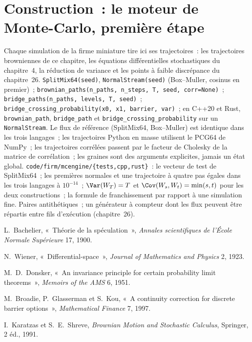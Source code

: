 \section{Construction~: le moteur de Monte-Carlo, première étape}\label{bld:qm:brownian-motion:mcengine}

\begin{build}
 Chaque simulation de la firme miniature tire ici ses trajectoires~: les trajectoires browniennes de ce chapitre,
les équations différentielles stochastiques du chapitre~4, la réduction de variance
et les points à faible discrépance du chapitre~26.
 \texttt{SplitMix64(seed)}, \texttt{NormalStream(seed)} (Box--Muller, cosinus
en premier)~; \texttt{brownian\_paths(n\_paths, n\_steps, T, seed, corr=None)}~;
\texttt{bridge\_paths(n\_paths, levels, T, seed)}~;
\texttt{bridge\_crossing\_probability(x0, x1, barrier, var)}~; en C++20 et Rust,
\texttt{brownian\_path}, \texttt{bridge\_path} et \texttt{bridge\_crossing\_probability} sur un
\texttt{NormalStream}.
 Le flux de référence (SplitMix64, Box--Muller) est identique dans les trois
langages~; les trajectoires Python en masse utilisent le PCG64 de NumPy~; les trajectoires corrélées passent par le facteur de Cholesky
de la matrice de corrélation~; les graines sont des arguments explicites, jamais un état global.
 \texttt{code/firm/mcengine/\{tests,cpp,rust\}}~: le vecteur de test
de SplitMix64~; les premières normales et une trajectoire à quatre pas égales dans les trois langages à $10^{-14}$~;
$\Var(W_T) = T$ et $\Cov(W_s, W_t) = \min(s,t)$ pour les deux constructions~; la formule de franchissement
par rapport à une simulation fine.
 Paires antithétiques~; un générateur à compteur dont les flux peuvent être répartis entre
fils d'exécution (chapitre~26).
\end{build}

\begin{omsources}
\item L.~Bachelier, «~Théorie de la spéculation~», \emph{Annales scientifiques de l'École
Normale Supérieure} 17, 1900.
\item N.~Wiener, «~Differential-space~», \emph{Journal of Mathematics and Physics} 2, 1923.
\item M.~D.~Donsker, «~An invariance principle for certain probability limit theorems~»,
\emph{Memoirs of the AMS} 6, 1951.
\item M.~Broadie, P.~Glasserman et S.~Kou, «~A continuity correction for discrete barrier
options~», \emph{Mathematical Finance} 7, 1997.
\item I.~Karatzas et S.~E.~Shreve, \emph{Brownian Motion and Stochastic Calculus},
Springer, 2 éd., 1991.
\end{omsources}


